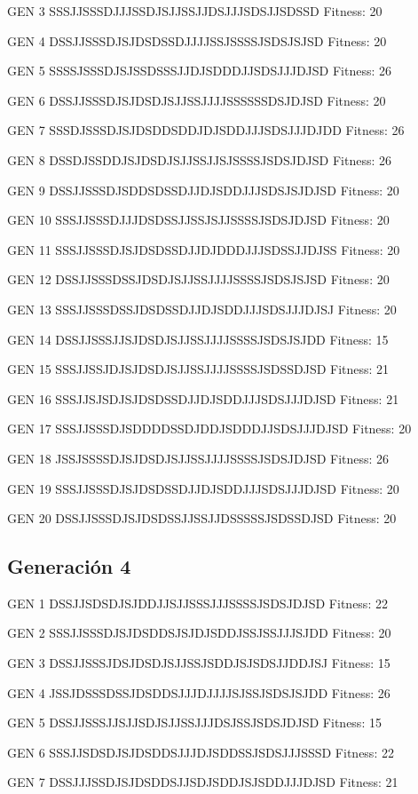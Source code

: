 \documentclass[a4paper,12pt]{article}
\begin{document}
GEN 3 SSSJJSSSDJJJSSDJSJJSSJJDSJJJSDSJJSDSSD Fitness: 20

GEN 4 DSSJJSSSDJSJDSDSSDJJJJSSJSSSSJSDSJSJSD Fitness: 20

GEN 5 SSSSJSSSDJSJSSDSSSJJDJSDDDJJSDSJJJDJSD Fitness: 26

GEN 6 DSSJJSSSDJSJDSDJSJJSSJJJJSSSSSSDSJDJSD Fitness: 20

GEN 7 SSSDJSSSDJSJDSDDSDDJDJSDDJJJSDSJJJDJDD Fitness: 26

GEN 8 DSSDJSSDDJSJDSDJSJJSSJJSJSSSSJSDSJDJSD Fitness: 26

GEN 9 DSSJJSSSDJSDDSDSSDJJDJSDDJJJSDSJSJDJSD Fitness: 20

GEN 10 SSSJJSSSDJJJDSDSSJJSSJSJJSSSSJSDSJDJSD Fitness: 20

GEN 11 SSSJJSSSDJSJDSDSSDJJDJDDDJJJSDSSJJDJSS Fitness: 20

GEN 12 DSSJJSSSDSSJDSDJSJJSSJJJJSSSSJSDSJSJSD Fitness: 20

GEN 13 SSSJJSSSDSSJDSDSSDJJDJSDDJJJSDSJJJDJSJ Fitness: 20

GEN 14 DSSJJSSSJJSJDSDJSJJSSJJJJSSSSJSDSJSJDD Fitness: 15

GEN 15 SSSJJSSJDJSJDSDJSJJSSJJJJSSSSJSDSSDJSD Fitness: 21

GEN 16 SSSJJSJSDJSJDSDSSDJJDJSDDJJJSDSJJJDJSD Fitness: 21

GEN 17 SSSJJSSSDJSDDDDSSDJDDJSDDDJJSDSJJJDJSD Fitness: 20

GEN 18 JSSJSSSSDJSJDSDJSJJSSJJJJSSSSJSDSJDJSD Fitness: 26

GEN 19 SSSJJSSSDJSJDSDSSDJJDJSDDJJJSDSJJJDJSD Fitness: 20

GEN 20 DSSJJSSSDJSJDSDSSJJSSJJDSSSSSJSDSSDJSD Fitness: 20

\subsection*{Generación 4}
GEN 1 DSSJJSDSDJSJDDJJSJJSSSJJJSSSSJSDSJDJSD Fitness: 22

GEN 2 SSSJJSSSDJSJDSDDSJSJDJSDDJSSJSSJJJSJDD Fitness: 20

GEN 3 DSSJJSSSJDSJDSDJSJJSSJSDDJSJSDSJJDDJSJ Fitness: 15

GEN 4 JSSJDSSSDSSJDSDDSJJJDJJJJSJSSJSDSJSJDD Fitness: 26

GEN 5 DSSJJSSSJJSJJSDJSJJSSJJJDSJSSJSDSJDJSD Fitness: 15

GEN 6 SSSJJSDSDJSJDSDDSJJJDJSDDSSJSDSJJJSSSD Fitness: 22

GEN 7 DSSJJJSSDJSJDSDDSJJSDJSDDJSJSDDJJJDJSD Fitness: 21
\end{document}
